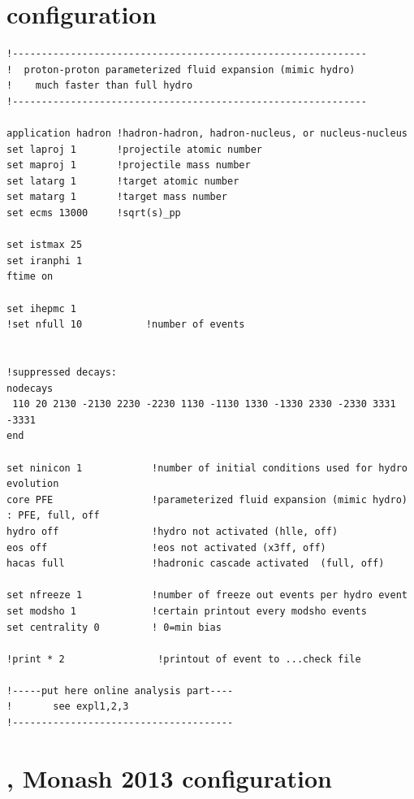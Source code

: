 \section{\Epos configuration}
\begin{verbatim}
!-------------------------------------------------------------
!  proton-proton parameterized fluid expansion (mimic hydro)
!    much faster than full hydro
!-------------------------------------------------------------

application hadron !hadron-hadron, hadron-nucleus, or nucleus-nucleus
set laproj 1       !projectile atomic number
set maproj 1       !projectile mass number
set latarg 1       !target atomic number
set matarg 1       !target mass number
set ecms 13000     !sqrt(s)_pp

set istmax 25
set iranphi 1
ftime on

set ihepmc 1
!set nfull 10           !number of events


!suppressed decays:
nodecays
 110 20 2130 -2130 2230 -2230 1130 -1130 1330 -1330 2330 -2330 3331 -3331
end

set ninicon 1            !number of initial conditions used for hydro evolution
core PFE                 !parameterized fluid expansion (mimic hydro) : PFE, full, off
hydro off                !hydro not activated (hlle, off)
eos off                  !eos not activated (x3ff, off)
hacas full               !hadronic cascade activated  (full, off)

set nfreeze 1            !number of freeze out events per hydro event
set modsho 1             !certain printout every modsho events
set centrality 0         ! 0=min bias

!print * 2                !printout of event to ...check file

!-----put here online analysis part----
!       see expl1,2,3
!--------------------------------------
\end{verbatim}

\section{\Pythiaeight, Monash 2013 configuration}

